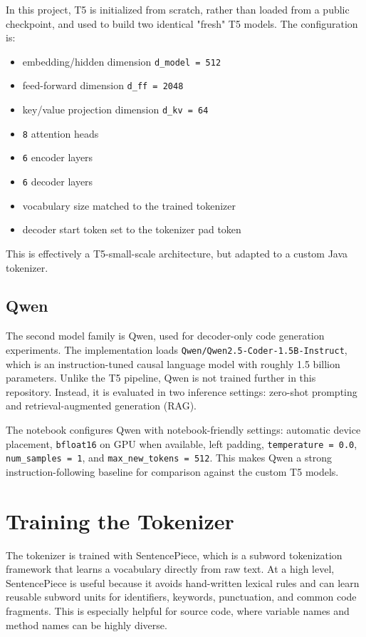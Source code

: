 \documentclass[11pt]{article}
\begin{document}
In this project, T5 is initialized from scratch, rather than loaded from a public checkpoint, and used to build two identical "fresh" T5 models. 
The configuration is:
\begin{itemize}[leftmargin=*]
\item embedding/hidden dimension \texttt{d\_model = 512}
\item feed-forward dimension \texttt{d\_ff = 2048}
\item key/value projection dimension \texttt{d\_kv = 64}
\item \texttt{8} attention heads
\item \texttt{6} encoder layers
\item \texttt{6} decoder layers
\item vocabulary size matched to the trained tokenizer
\item decoder start token set to the tokenizer pad token
\end{itemize}
This is effectively a T5-small-scale architecture, but adapted to a custom Java tokenizer.

\subsection{Qwen}
The second model family is Qwen, used for decoder-only code generation experiments. The implementation loads \texttt{Qwen/Qwen2.5-Coder-1.5B-Instruct}, which is an instruction-tuned causal language model with roughly 1.5 billion parameters. Unlike the T5 pipeline, Qwen is not trained further in this repository. Instead, it is evaluated in two inference settings: zero-shot prompting and retrieval-augmented generation (RAG).

The notebook configures Qwen with notebook-friendly settings: automatic device placement, \texttt{bfloat16} on GPU when available, left padding, \texttt{temperature = 0.0}, \texttt{num\_samples = 1}, and \texttt{max\_new\_tokens = 512}. This makes Qwen a strong instruction-following baseline for comparison against the custom T5 models.

\section{Training the Tokenizer}
The tokenizer is trained with SentencePiece, which is a subword tokenization framework that learns a vocabulary directly from raw text. At a high level, SentencePiece is useful because it avoids hand-written lexical rules and can learn reusable subword units for identifiers, keywords, punctuation, and common code fragments. This is especially helpful for source code, where variable names and method names can be highly diverse.
\end{document}
